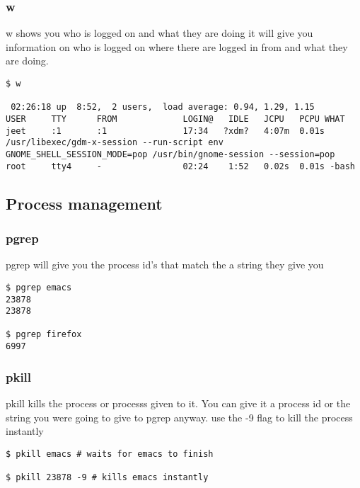 \documentclass[a4paper]{article}
\begin{document}
\subsubsection*{w}
\label{sec:orgd9ed30a}
\begin{notes}
	w shows you who is logged on and what they are doing
	it will give you information on who is logged on where there are logged in from
	and what they are doing.
\end{notes}

\begin{verbatim}
$ w

 02:26:18 up  8:52,  2 users,  load average: 0.94, 1.29, 1.15
USER     TTY      FROM             LOGIN@   IDLE   JCPU   PCPU WHAT
jeet     :1       :1               17:34   ?xdm?   4:07m  0.01s /usr/libexec/gdm-x-session --run-script env GNOME_SHELL_SESSION_MODE=pop /usr/bin/gnome-session --session=pop
root     tty4     -                02:24    1:52   0.02s  0.01s -bash
\end{verbatim}

\subsection*{Process management}
\label{sec:orga51c226}
\subsubsection*{pgrep}
\label{sec:org1a0549d}
\begin{notes}
	pgrep will give you the process id's that match the a string they give you
\end{notes}
\begin{verbatim}
$ pgrep emacs
23878
23878

$ pgrep firefox
6997
\end{verbatim}
\subsubsection*{pkill}
\label{sec:orgf9ea4f2}
\begin{notes}
	pkill kills the process or processs given to it. You can give it a process id or
	the string you were going to give to pgrep anyway. use the -9 flag to kill the
	process instantly
\end{notes}

\begin{verbatim}
$ pkill emacs # waits for emacs to finish

$ pkill 23878 -9 # kills emacs instantly

\end{verbatim}
\end{document}
